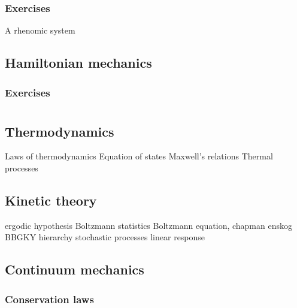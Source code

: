\documentclass{../../large}
\begin{document}
\section*{Exercises}
\begin{prb}[Brachiostochrone]
\end{prb}
\begin{prb}
\end{prb}
\begin{prb}
\end{prb}
\begin{prb}
A rhenomic system
\end{prb}
\begin{prb}
\end{prb}
\begin{prb}
\end{prb}


\chapter{Hamiltonian mechanics}

\section*{Exercises}




\part{}

\chapter{Thermodynamics}
Laws of thermodynamics
Equation of states
Maxwell's relations
Thermal processes

\chapter{Kinetic theory}
ergodic hypothesis
Boltzmann statistics
Boltzmann equation, chapman enskog
BBGKY hierarchy
stochastic processes
linear response

\chapter{Continuum mechanics}
\section{Conservation laws}
\end{document}
